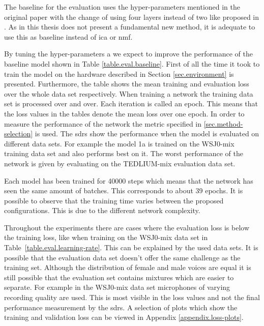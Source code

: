 The baseline for the evaluation uses the hyper-parameters mentioned in the original paper \cite{Hershey2016} with the change of using four layers instead of two like proposed in \cite{Isik2016}.
As in this thesis does not present a fundamental new method, it is adequate to use this as baseline instead of \gls{ica} or \gls{nmf}. 

By tuning the hyper-parameters a we expect to improve the performance of the baseline model shown in Table \ref{table.eval.baseline}. 
First of all the time it took to train the model on the hardware described in Section \ref{sec.environment} is presented.
Furthermore, the table shows the mean training and evaluation loss over the whole data set respectively. When training a network the training data set is processed over and over. Each iteration is called an epoch. This means that the loss values in the tables denote the mean loss over one epoch.
In order to measure the performance of the network the metric specified in \ref{sec.method-selection} is used. The \glspl{sdr} show the performance when the model is evaluated on different data sets. For example the model 1a is trained on the WSJ0-mix training data set and also performs best on it. The worst performance of the network is given by evaluating on the TEDLIUM-mix evaluation data set. 

Each model has been trained for 40000 steps which means that the network has seen the same amount of batches. This corresponds to about 39 epochs. It is possible to observe that the training time varies between the proposed configurations. This is due to the different network complexity.

Throughout the experiments there are cases where the evaluation loss is below the training loss, like when training on the WSJ0-mix data set in Table~\ref{table.eval.learning-rate}. This can be explained by the used data sets. It is possible that the evaluation data set doesn't offer the same challenge as the training set. Although the distribution of female and male voices are equal it is still possible that the evaluation set contains mixtures which are easier to separate. For example in the WSJ0-mix data set microphones of varying recording quality are used. This is most visible in the loss values and not the final performance measurement by the \glspl{sdr}. A selection of plots which show the training and validation loss can be viewed in Appendix \ref{appendix.loss-plots}.

